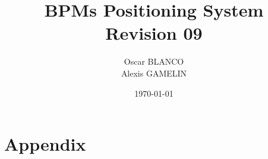 \documentclass[a4paper,11pt]{book}
\title{BPMs Positioning System\\{\small Revision 09}}
\author{Oscar BLANCO\\Alexis GAMELIN}
\date{\today}
\begin{document}
\maketitle
\tableofcontents
\listoffigures
\listoftables
\frontmatter

\mainmatter




\appendix
\chapter{Appendix}



\backmatter

\end{document}
